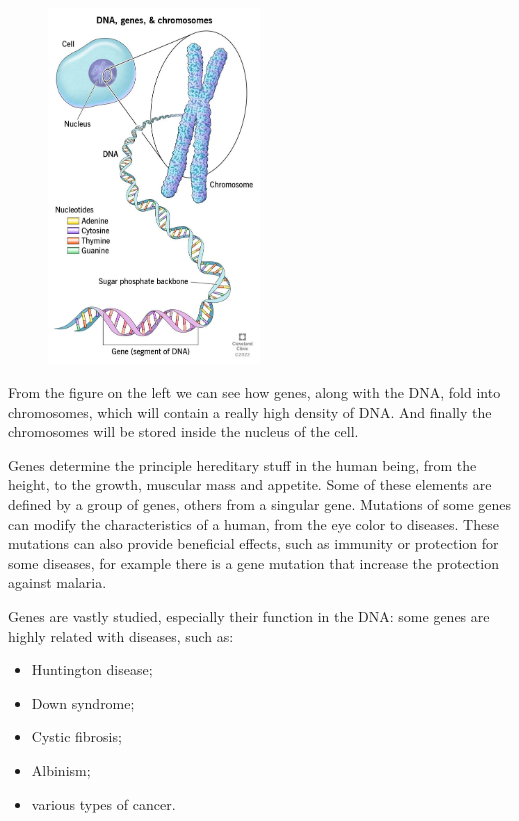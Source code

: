 \begin{figure} %
	\centering
	\includegraphics[width=0.5\textwidth]{res/proteins_overview/genes.png}
\end{figure}

From the figure on the left we can see how genes, along with the DNA, fold into chromosomes, which will contain a really high density of DNA. And finally the chromosomes will be stored inside the nucleus of the cell.

Genes determine the principle hereditary stuff in the human being, from the height, to the growth, muscular mass and appetite. Some of these elements are defined by a group of genes, others from a singular gene. Mutations of some genes can modify the characteristics of a human, from the eye color to diseases. These mutations can also provide beneficial effects, such as immunity or protection for some diseases, for example there is a gene mutation that increase the protection against malaria.

Genes are vastly studied, especially their function in the DNA: some genes are highly related with diseases, such as:
\begin{itemize}
	\item Huntington disease;
	\item Down syndrome;
	\item Cystic fibrosis;
	\item Albinism;
	\item various types of cancer.
\end{itemize}

